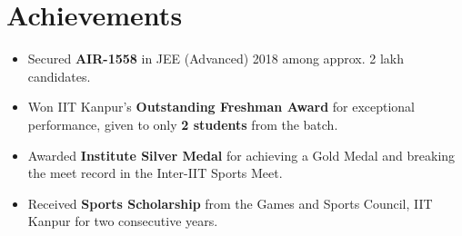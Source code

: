 \documentclass[10pt,a4paper]{article}
\newcommand{\resumeItem}[1]{\item[\textcolor{primary}{\textbullet}] #1}
\begin{document}
\section{Achievements}
\small
\begin{itemize}[leftmargin=1.05em, nosep, topsep=0pt, itemsep=0pt, parsep=0pt]
    \resumeItem{Secured \textbf{AIR-1558} in JEE (Advanced) 2018 among approx. 2 lakh candidates.}
\resumeItem{Won IIT Kanpur's \textbf{Outstanding Freshman Award} for exceptional performance, given to only \textbf{2 students} from the batch.}
    \resumeItem{Awarded \textbf{Institute Silver Medal} for achieving a Gold Medal and breaking the meet record in the Inter-IIT Sports Meet.}
    \resumeItem{Received \textbf{Sports Scholarship} from the Games and Sports Council, IIT Kanpur for two consecutive years.}
\end{itemize}
\end{document}
